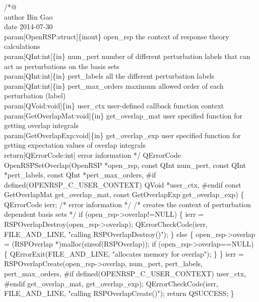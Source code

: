 /*@%
     \\author Bin Gao
     \\date 2014-07-30
     \\param[OpenRSP:struct]\{inout\} open_rsp the context of response theory calculations
     \\param[QInt:int]\{in\} num_pert number of different perturbation labels that can
         act as perturbations on the basis sets
     \\param[QInt:int]\{in\} pert_labels all the different perturbation labels
     \\param[QInt:int]\{in\} pert_max_orders maximum allowed order of each perturbation (label)
     \\param[QVoid:void]\{in\} user_ctx user-defined callback function context
     \\param[GetOverlapMat:void]\{in\} get_overlap_mat user specified function for
         getting overlap integrals
     \\param[GetOverlapExp:void]\{in\} get_overlap_exp user specified function for
         getting expectation values of overlap integrals
     \\return[QErrorCode:int] error information
*/
QErrorCode OpenRSPSetOverlap(OpenRSP *open_rsp,
                             const QInt num_pert,
                             const QInt *pert_labels,
                             const QInt *pert_max_orders,
#if defined(OPENRSP_C_USER_CONTEXT)
                             QVoid *user_ctx,
#endif
                             const GetOverlapMat get_overlap_mat,
                             const GetOverlapExp get_overlap_exp)
\{
    QErrorCode ierr;  /* error information */
    /* creates the context of perturbation dependent basis sets */
    if (open_rsp->overlap!=NULL) \{
        ierr = RSPOverlapDestroy(open_rsp->overlap);
        QErrorCheckCode(ierr, FILE_AND_LINE, "calling RSPOverlapDestroy()");
    \}
    else \{
        open_rsp->overlap = (RSPOverlap *)malloc(sizeof(RSPOverlap));
        if (open_rsp->overlap==NULL) \{
            QErrorExit(FILE_AND_LINE, "allocates memory for overlap");
        \}
    \}
    ierr = RSPOverlapCreate(open_rsp->overlap,
                            num_pert,
                            pert_labels,
                            pert_max_orders,
#if defined(OPENRSP_C_USER_CONTEXT)
                            user_ctx,
#endif
                            get_overlap_mat,
                            get_overlap_exp);
    QErrorCheckCode(ierr, FILE_AND_LINE, "calling RSPOverlapCreate()");
    return QSUCCESS;
\}
\nwendcode{}\nwdocspar

